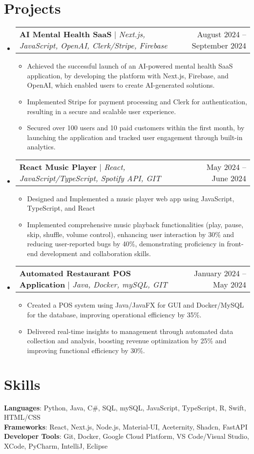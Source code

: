 \documentclass[letterpaper,11pt]{article}
\makeatletter
\newcommand{\resumeItem}[1]{
  \item\small{
    {#1 \vspace{-1pt}}
  }
}
\newcommand{\resumeProjectHeading}[2]{
    \item
    \begin{tabular*}{0.97\textwidth}{l@{\extracolsep{\fill}}r}
      \small#1 & #2 \\
    \end{tabular*}\vspace{-6pt}
}
\newcommand{\resumeSubHeadingListStart}{\begin{itemize}[leftmargin=0.15in, label={}]}
\newcommand{\resumeSubHeadingListEnd}{\end{itemize}}
\newcommand{\resumeItemListStart}{\begin{itemize}}
\newcommand{\resumeItemListEnd}{\end{itemize}\vspace{-5pt}}
\makeatother
\begin{document}
\section{Projects}
    \resumeSubHeadingListStart
      \resumeProjectHeading
          {\textbf{AI Mental Health SaaS} $|$ \emph{Next.js, JavaScript, OpenAI, Clerk/Stripe, Firebase}}{August 2024 -- September 2024}
          \resumeItemListStart
            \resumeItem{Achieved the successful launch of an AI-powered mental health SaaS application, by developing the platform with Next.js, Firebase, and OpenAI, which enabled users to create AI-generated solutions.}
            \resumeItem{Implemented Stripe for payment processing and Clerk for authentication, resulting in a secure and scalable user experience.}
            \resumeItem{Secured over 100 users and 10 paid customers within the first month, by launching the application and tracked user engagement through built-in analytics.}
          \resumeItemListEnd
      \resumeProjectHeading
          {\textbf{React Music Player} $|$ \emph{React, JavaScript/TypeScript, Spotify API, GIT}}{May 2024 -- June 2024}
          \resumeItemListStart
            \resumeItem{Designed and Implemented a music player web app using JavaScript, TypeScript, and React}
            \resumeItem{Implemented comprehensive music playback functionalities (play, pause, skip, shuffle, volume control), enhancing user interaction by 30\% and reducing user-reported bugs by 40\%, demonstrating proficiency in front-end development and collaboration skills.}
          \resumeItemListEnd
        \resumeProjectHeading
          {\textbf{Automated Restaurant POS Application} $|$ \emph{Java, Docker, mySQL, GIT}}{January 2024 -- May 2024}
          \resumeItemListStart
            \resumeItem{Created a POS system using Java/JavaFX for GUI and Docker/MySQL for the database, improving operational efficiency by 35\%.}
            \resumeItem{Delivered real-time insights to management through automated data collection and analysis, boosting revenue optimization by 25\% and improving functional efficiency by 30\%.}
          \resumeItemListEnd
    \resumeSubHeadingListEnd



%
\section{Skills}
 \begin{itemize}[leftmargin=0.15in, label={}]
    \small{\item{
     \textbf{Languages}{: Python, Java, C#, SQL, mySQL, JavaScript, TypeScript, R, Swift, HTML/CSS} \\
     \textbf{Frameworks}{: React, Next.js, Node.js, Material-UI, Aceternity, Shadcn, FastAPI} \\
     \textbf{Developer Tools}{: Git, Docker, Google Cloud Platform, VS Code/Visual Studio, XCode, PyCharm, IntelliJ, Eclipse} \\
    }}
 \end{itemize}


\end{document}
